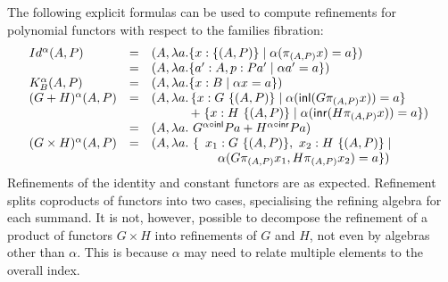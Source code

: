 \documentclass{LMCS}
\newcommand{\sepbar}{\mathrel|}
\begin{document}
The following explicit formulas can be used to compute refinements for
polynomial functors with respect to the families fibration:
\[\begin{array}{lll}
  Id^{\alpha}(A,P) &=& (A, \lambda a. \{ x :\{ (A,P)\} \sepbar \alpha
  (\pi_{(A,P)} x) = a \})\\
 &=& (A, \lambda a. \{ a' : A, p : Pa' \sepbar \alpha a' = a \}) \\ 
  K_B^{\alpha}(A,P) &=& (A, \lambda a. \{x : B \sepbar \alpha x = a \})\\
  (G + H)^\alpha(A, P)
  &=& (A, \lambda a.
  \begin{array}[t]{l}
    \!\!\{ x : G\ \{(A,P)\} \sepbar \alpha (\mathsf{inl} (G\pi_{(A,P)}
    x)) = a \} \\ 
    \!\! \mathrel+ \{x : H\ \{(A,P)\} \sepbar \alpha (\mathsf{inr} (H\pi_{(A,P)}
    x)) = a \})
  \end{array} \\
  &=& (A, \lambda a.\ G^{\alpha \circ \mathsf{inl}}Pa + H^{\alpha
    \circ \mathsf{inr}}Pa)\\ 
  (G \times H)^\alpha(A,P)
  &=& (A, \lambda a.\ \{
  \begin{array}[t]{l}
    x_1 : G\ \{(A,P)\},\ x_2 : H\ \{(A,P)\} \sepbar \\
    \quad \alpha (G\pi_{(A,P)} x_1, H\pi_{(A,P)} x_2) = a \})
  \end{array}
\end{array}\]
Refinements of the identity and constant functors are as expected.
Refinement splits coproducts of functors into two cases, 
specialising the refining algebra for each summand. It is not, however,
possible to decompose the refinement of a product of functors $G
\times H$ into refinements of $G$ and $H$, not even by algebras other
than $\alpha$. This is because $\alpha$ may need to relate multiple 
elements to the overall index. 
\end{document}
